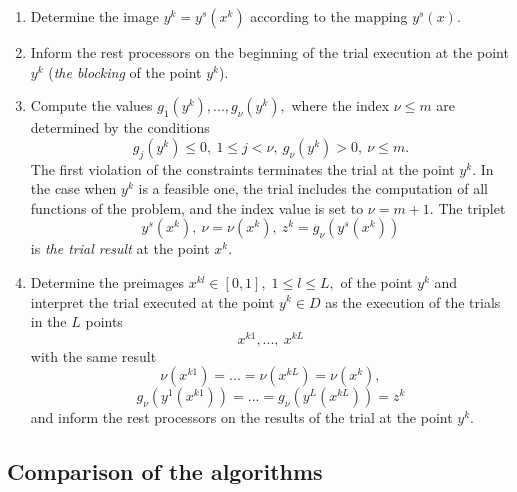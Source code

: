 \begin{enumerate}
	\item Determine the image $y^k=y^s(x^k)$ according to the mapping  $y^s(x)$.
	\item Inform the rest processors on the beginning of the trial execution at the point  $y^k$ (\textit{the blocking} of the point $y^k$).
	\item Compute the values $g_1(y^k),...,g_\nu(y^k),$ where the index $\nu \leq m$ are determined by the conditions
	\[
	g_j(y^k)\leq 0,\ 1\leq j< \nu,\ g_\nu(y^k) > 0,\ \nu \leq m.
	\]
	The first violation of the constraints terminates the trial at the point  $y^k$. In the case when $y^k$ is a feasible one, the trial includes the computation of all functions of the problem, and the index value is set to $\nu = m+1$. The triplet
	\begin{equation}\label{6_triplet_r} 
	y^s(x^k),\ \nu = \nu(x^k),\ z^k=g_\nu(y^s(x^k))
	\end{equation}
	is  \textit{the trial result} at the point $x^k$.
	\item Determine the preimages $x^{kl} \in [0,1],\; 1\leq l \leq L,$ of the point $y^k$ and interpret the trial executed at the point $y^k \in D$ as the execution of the trials in the $L$ points 
	\[
	x^{k1},...,\ x^{kL}
	\]
	with the same result 
	\[
	\nu(x^{k1})=...=\nu(x^{kL})=\nu(x^k),	
	\]
	\[
	g_\nu(y^1(x^{k1}))=...=g_\nu(y^L(x^{kL}))=z^k	
	\]
	and inform the rest processors on the results of the trial at the point $y^k$.		
\end{enumerate}

\subsection{Comparison of the algorithms}


